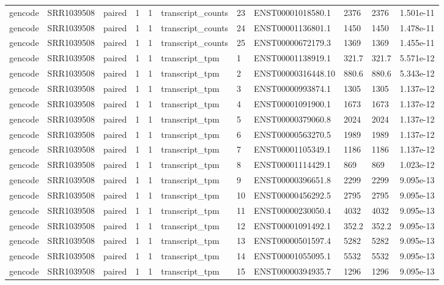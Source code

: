 \begin{tabular}{lllllllllll}
gencode & SRR1039508 & paired & 1 & 1 & transcript\_counts & 23 & ENST00001018580.1 & 2376 & 2376 & 1.501e-11 \\
gencode & SRR1039508 & paired & 1 & 1 & transcript\_counts & 24 & ENST00001136801.1 & 1450 & 1450 & 1.478e-11 \\
gencode & SRR1039508 & paired & 1 & 1 & transcript\_counts & 25 & ENST00000672179.3 & 1369 & 1369 & 1.455e-11 \\
gencode & SRR1039508 & paired & 1 & 1 & transcript\_tpm & 1 & ENST00001138919.1 & 321.7 & 321.7 & 5.571e-12 \\
gencode & SRR1039508 & paired & 1 & 1 & transcript\_tpm & 2 & ENST00000316448.10 & 880.6 & 880.6 & 5.343e-12 \\
gencode & SRR1039508 & paired & 1 & 1 & transcript\_tpm & 3 & ENST00000993874.1 & 1305 & 1305 & 1.137e-12 \\
gencode & SRR1039508 & paired & 1 & 1 & transcript\_tpm & 4 & ENST00001091900.1 & 1673 & 1673 & 1.137e-12 \\
gencode & SRR1039508 & paired & 1 & 1 & transcript\_tpm & 5 & ENST00000379060.8 & 2024 & 2024 & 1.137e-12 \\
gencode & SRR1039508 & paired & 1 & 1 & transcript\_tpm & 6 & ENST00000563270.5 & 1989 & 1989 & 1.137e-12 \\
gencode & SRR1039508 & paired & 1 & 1 & transcript\_tpm & 7 & ENST00001105349.1 & 1186 & 1186 & 1.137e-12 \\
gencode & SRR1039508 & paired & 1 & 1 & transcript\_tpm & 8 & ENST00001114429.1 & 869 & 869 & 1.023e-12 \\
gencode & SRR1039508 & paired & 1 & 1 & transcript\_tpm & 9 & ENST00000396651.8 & 2299 & 2299 & 9.095e-13 \\
gencode & SRR1039508 & paired & 1 & 1 & transcript\_tpm & 10 & ENST00000456292.5 & 2795 & 2795 & 9.095e-13 \\
gencode & SRR1039508 & paired & 1 & 1 & transcript\_tpm & 11 & ENST00000230050.4 & 4032 & 4032 & 9.095e-13 \\
gencode & SRR1039508 & paired & 1 & 1 & transcript\_tpm & 12 & ENST00001091492.1 & 352.2 & 352.2 & 9.095e-13 \\
gencode & SRR1039508 & paired & 1 & 1 & transcript\_tpm & 13 & ENST00000501597.4 & 5282 & 5282 & 9.095e-13 \\
gencode & SRR1039508 & paired & 1 & 1 & transcript\_tpm & 14 & ENST00001055095.1 & 5532 & 5532 & 9.095e-13 \\
gencode & SRR1039508 & paired & 1 & 1 & transcript\_tpm & 15 & ENST00000394935.7 & 1296 & 1296 & 9.095e-13 \\

\end{tabular}
